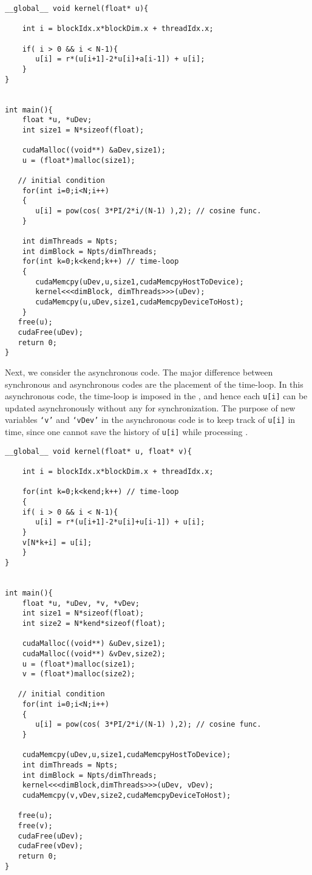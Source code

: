 \documentclass[1p]{elsarticle}
\begin{document}
\begin{itemize}
{\color[rgb]{0.54, 0.2, 0.14}{\item \bf Synchronous Algorithm}}
\begin{lstlisting}
__global__ void kernel(float* u){

    int i = blockIdx.x*blockDim.x + threadIdx.x;
  
	if( i > 0 && i < N-1){
	   u[i] = r*(u[i+1]-2*u[i]+a[i-1]) + u[i];
	}
}


int main(){
    float *u, *uDev;
    int size1 = N*sizeof(float);

    cudaMalloc((void**) &aDev,size1);
    u = (float*)malloc(size1);

   // initial condition
    for(int i=0;i<N;i++)
    {
	   u[i] = pow(cos( 3*PI/2*i/(N-1) ),2); // cosine func.
    }

    int dimThreads = Npts;
    int dimBlock = Npts/dimThreads;
    for(int k=0;k<kend;k++) // time-loop
    {
	   cudaMemcpy(uDev,u,size1,cudaMemcpyHostToDevice);
	   kernel<<<dimBlock, dimThreads>>>(uDev);
	   cudaMemcpy(u,uDev,size1,cudaMemcpyDeviceToHost);
    }
   free(u);
   cudaFree(uDev);
   return 0;
}
\end{lstlisting}

Next, we consider the asynchronous code. The major difference between synchronous and asynchronous codes are the placement of the time-loop. In this asynchronous code, the time-loop is imposed in the , and hence each \texttt{u[i]} can be updated asynchronously without any   for synchronization. The purpose of new variables \texttt{`v'} and \texttt{`vDev'} in the asynchronous code is to keep track of \texttt{u[i]} in time, since one cannot save the history of \texttt{u[i]} while processing .




{\color[rgb]{0.54, 0.2, 0.14}{\item \bf Asynchronous Algorithm}}
\begin{lstlisting}
__global__ void kernel(float* u, float* v){

    int i = blockIdx.x*blockDim.x + threadIdx.x;
  
    for(int k=0;k<kend;k++) // time-loop
    {
	if( i > 0 && i < N-1){
	   u[i] = r*(u[i+1]-2*u[i]+u[i-1]) + u[i];
	}
	v[N*k+i] = u[i];
    }
}


int main(){
    float *u, *uDev, *v, *vDev;
    int size1 = N*sizeof(float);
    int size2 = N*kend*sizeof(float);

    cudaMalloc((void**) &uDev,size1);
    cudaMalloc((void**) &vDev,size2);
    u = (float*)malloc(size1);
    v = (float*)malloc(size2);

   // initial condition
    for(int i=0;i<N;i++)
    {
	   u[i] = pow(cos( 3*PI/2*i/(N-1) ),2); // cosine func.
    }

    cudaMemcpy(uDev,u,size1,cudaMemcpyHostToDevice);
    int dimThreads = Npts;
    int dimBlock = Npts/dimThreads;
    kernel<<<dimBlock,dimThreads>>>(uDev, vDev);
    cudaMemcpy(v,vDev,size2,cudaMemcpyDeviceToHost);
 
   free(u);
   free(v);
   cudaFree(uDev);
   cudaFree(vDev);
   return 0;
}
\end{lstlisting}
\end{itemize}
\end{document}
